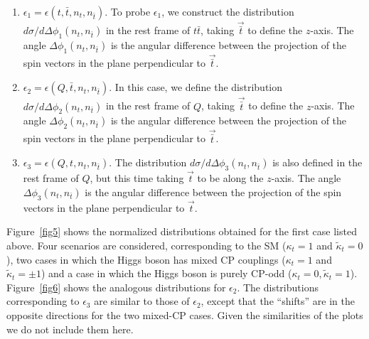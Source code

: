 \documentclass[aps,preprint,tightenlines,floatfix,superscriptaddress,nofootinbib,showpacs]{revtex4-1}
\def\tbar{\bar{t}}
\def\kp{\kappa_t}
\def\kpt{\tilde{\kappa}_t}
\def\TPa{\epsilon(t,\tbar,n_t,n_{\tbar})}
\def\TPb{\epsilon(Q,\tbar,n_t,n_{\tbar})}
\def\TPc{\epsilon(Q,t,n_t,n_{\tbar})}
\begin{document}
 \begin{enumerate} 
\item {\boldmath $\epsilon_1 = \TPa$.}  To probe $\epsilon_1$, we construct
  the distribution
  $d\sigma/d\Delta\phi_1(n_t,n_{\tbar})$ in the rest frame of $t\tbar$,
  taking $\vec{\tbar}$ to define the $z$-axis. The angle
  $\Delta\phi_1(n_t,n_{\tbar})$ is the angular difference between the
  projection of the spin vectors in the plane perpendicular to
  $\vec{\tbar}$.
\item {\boldmath $\epsilon_2 = \TPb$.}  In this case, we
  define the distribution
  $d\sigma/d\Delta\phi_2(n_t,n_{\tbar})$ in the rest frame of $Q$, taking
  $\vec{\tbar}$ to define the $z$-axis. The angle
  $\Delta\phi_2(n_t,n_{\tbar})$ is the angular difference between the
  projection of the spin vectors in the plane perpendicular to
  $\vec{\tbar}$.
\item {\boldmath $\epsilon_3 = \TPc$.}  The distribution
  $d\sigma/d\Delta\phi_3(n_t,n_{\tbar})$ is also defined
  in the rest frame of $Q$, but this time taking
  $\vec{t}$ to be along the $z$-axis. The angle $\Delta\phi_3(n_t,n_{\tbar})$
  is the angular difference between the projection of the spin vectors
  in the plane perpendicular to $\vec{t}$.
 \end{enumerate} 
\par
%
Figure~\ref{fig5} shows the normalized distributions obtained
for the first case listed above.
Four scenarios are considered, corresponding to the SM
($\kp= 1$ and $\kpt=0$), two cases in which the Higgs boson
has mixed $\mathrm{CP}$ couplings ($\kp= 1$ and $\kpt=\pm 1$)
and a case in which the Higgs boson is purely 
$\mathrm{CP}$-odd ($\kp= 0,\kpt=1$). Figure~\ref{fig6} shows
the analogous distributions for $\epsilon_2$. The distributions
corresponding to $\epsilon_3$ are similar to those of $\epsilon_2$,
except that the ``shifts'' are in the opposite directions for
the two mixed-$\mathrm{CP}$ cases.  Given the similarities of the
plots we do not include them here. 
\end{document}
